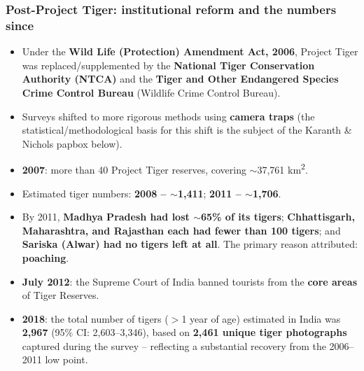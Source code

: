 \documentclass[11pt,a4paper]{article}
\begin{document}
\subsubsection{Post-Project Tiger: institutional reform and the numbers since}
\begin{keybox}[title={Timeline of institutional and population changes}]
\begin{itemize}[leftmargin=*]
\item Under the \textbf{Wild Life (Protection) Amendment Act, 2006}, Project Tiger was replaced/supplemented by the \textbf{National Tiger Conservation Authority (NTCA)} and the \textbf{Tiger and Other Endangered Species Crime Control Bureau} (Wildlife Crime Control Bureau).
\item Surveys shifted to more rigorous methods using \textbf{camera traps} (the statistical/methodological basis for this shift is the subject of the Karanth \& Nichols papbox below).
\item \textbf{2007}: more than 40 Project Tiger reserves, covering $\sim$37,761 km\textsuperscript{2}.
\item Estimated tiger numbers: \textbf{2008 -- $\sim$1,411}; \textbf{2011 -- $\sim$1,706}.
\item By 2011, \textbf{Madhya Pradesh had lost $\sim$65\% of its tigers}; \textbf{Chhattisgarh, Maharashtra, and Rajasthan each had fewer than 100 tigers}; and \textbf{Sariska (Alwar) had no tigers left at all}. The primary reason attributed: \textbf{poaching}.
\item \textbf{July 2012}: the Supreme Court of India banned tourists from the \textbf{core areas} of Tiger Reserves.
\item \textbf{2018}: the total number of tigers ($>$1 year of age) estimated in India was \textbf{2,967} (95\% CI: 2,603--3,346), based on \textbf{2,461 unique tiger photographs} captured during the survey -- reflecting a substantial recovery from the 2006--2011 low point.
\end{itemize}
\end{keybox}
\end{document}
